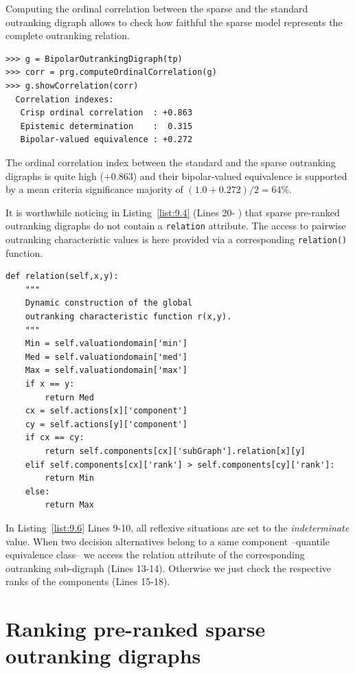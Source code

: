 Computing the ordinal correlation between the sparse and the standard outranking digraph allows to check how faithful the sparse model represents the complete outranking relation.
\begin{lstlisting}
>>> g = BipolarOutrankingDigraph(tp)
>>> corr = prg.computeOrdinalCorrelation(g)
>>> g.showCorrelation(corr)
  Correlation indexes:
   Crisp ordinal correlation  : +0.863
   Epistemic determination    :  0.315
   Bipolar-valued equivalence : +0.272
\end{lstlisting}   

The ordinal correlation index between the standard and the sparse outranking digraphs is quite high ($+0.863$) and their bipolar-valued equivalence is supported by a mean criteria significance majority of $(1.0+0.272)/2 = 64\%$.

It is worthwhile noticing in Listing~\vref{list:9.4} (Lines 20- ) that sparse pre-ranked outranking digraphs do not contain a \texttt{relation} attribute. The access to pairwise outranking characteristic values is here provided via a corresponding \texttt{relation()} function.
\begin{lstlisting}[caption={Functional binary relation characteristics},label=list:9.6]
def relation(self,x,y):
    """
    Dynamic construction of the global
    outranking characteristic function r(x,y).
    """
    Min = self.valuationdomain['min']
    Med = self.valuationdomain['med']
    Max = self.valuationdomain['max']
    if x == y:
        return Med
    cx = self.actions[x]['component']
    cy = self.actions[y]['component']
    if cx == cy:
        return self.components[cx]['subGraph'].relation[x][y]
    elif self.components[cx]['rank'] > self.components[cy]['rank']:
        return Min
    else:
        return Max
\end{lstlisting}

In Listing~\vref{list:9.6} Lines 9-10, all reflexive situations are set to the \emph{indeterminate} value. When two decision alternatives belong to a same component --quantile equivalence class-- we access the relation attribute of the corresponding outranking sub-digraph (Lines 13-14). Otherwise we just check the respective ranks of the components (Lines 15-18).

\section{Ranking pre-ranked sparse outranking digraphs}
\label{sec:9.4}

